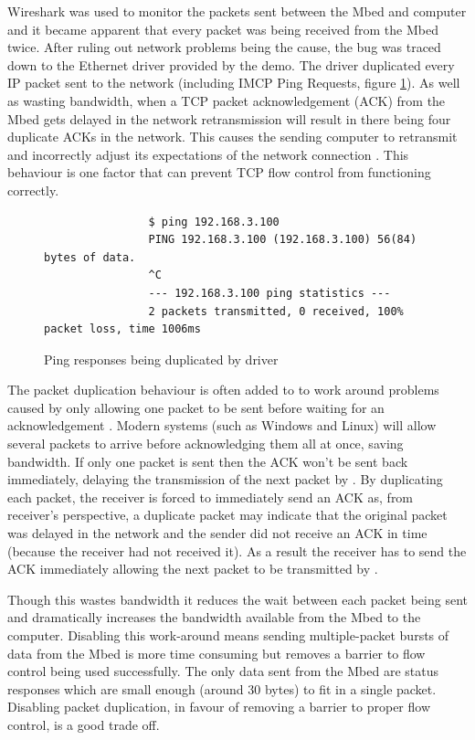 		
		\label{sec:udpPerformance}
		
		Wireshark was used to monitor the packets sent between the Mbed and computer
		and it became apparent that every packet was being received from the Mbed
		twice. After ruling out network problems being the cause, the bug was traced
		down to the Ethernet driver provided by the demo. The driver duplicated
		every IP packet sent to the network (including IMCP Ping Requests, figure
		\ref{fig:ping}). As well as wasting bandwidth, when a TCP packet
		acknowledgement (ACK) from the Mbed gets delayed in the network
		retransmission will result in there being four duplicate ACKs in the
		network. This causes the sending computer to retransmit and incorrectly
		adjust its expectations of the network connection \cite{duplicateack}. This
		behaviour is one factor that can prevent TCP flow control from functioning
		correctly.
		
		\begin{figure}
			\begin{verbatim}
				$ ping 192.168.3.100
				PING 192.168.3.100 (192.168.3.100) 56(84) bytes of data.
				^C
				--- 192.168.3.100 ping statistics ---
				2 packets transmitted, 0 received, 100% packet loss, time 1006ms
			\end{verbatim}
			\caption{Ping responses being duplicated by \uIP{} driver}
			\label{fig:ping}
		\end{figure}
		
		The packet duplication behaviour is often added to to work around problems
		caused by \uIP{} only allowing one packet to be sent before waiting for an
		acknowledgement \cite{allpacketsdup}. Modern systems (such as Windows and
		Linux) will allow several packets to arrive before acknowledging them all at
		once, saving bandwidth. If only one packet is sent then the ACK won't be
		sent back immediately, delaying the transmission of the next packet by
		\uIP{}. By duplicating each packet, the receiver is forced to immediately
		send an ACK as, from receiver's perspective, a duplicate packet may indicate
		that the original packet was delayed in the network and the sender did not
		receive an ACK in time (because the receiver had not received it). As a
		result the receiver has to send the ACK immediately allowing the next packet
		to be transmitted by \uIP{}.
		
		Though this wastes bandwidth it reduces the wait between each packet being
		sent and dramatically increases the bandwidth available from the Mbed to the
		computer. Disabling this work-around means sending multiple-packet bursts of
		data from the Mbed is more time consuming but removes a barrier to flow
		control being used successfully. The only data sent from the Mbed are status
		responses which are small enough (around 30 bytes) to fit in a single
		packet. Disabling packet duplication, in favour of removing a barrier to
		proper flow control, is a good trade off.
		
